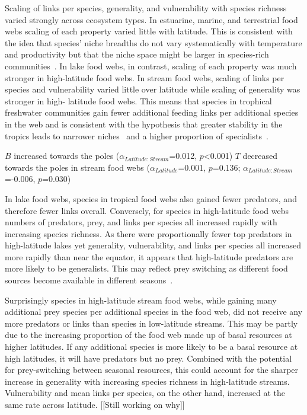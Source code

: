 \documentclass[12pt]{article}
\begin{document}
Scaling of links per species, generality, and vulnerability with species
richness varied strongly across ecosystem types. In estuarine, marine, and
terrestrial food webs scaling of each property varied little with latitude.
This is consistent with the idea that species' niche breadths do not vary
systematically with temperature and productivity but that the niche space
might be larger in species-rich communities~\citep{Davies2007}. In lake food
webs, in contrast, scaling of each property was much stronger in high-latitude
food webs. In stream food webs, scaling of links per species and vulnerability
varied little over latitude while scaling of generality was stronger in high-
latitude food webs. This means that species in trophical freshwater
communities gain fewer additional feeding links per additional species in the
web and is consistent with the hypothesis that greater stability in the
tropics leads to narrower niches~\citep{Brown2004} and a higher proportion of
specialists~\citep{}.



   $B$ increased towards the poles ($\alpha_{Latitude:Stream}$=0.012, $p$\textless0.001)
   $T$ decreased towards the poles in stream food webs ($\alpha_{Latitude}$=0.001, $p$=0.136;
  $\alpha_{Latitude:Stream}$=-0.006, $p$=0.030) 


In lake food webs, species in tropical food webs also gained fewer predators,
and therefore fewer links overall. Conversely, for species in high-latitude
food webs numbers of predators, prey, and links per species all increased
rapidly with increasing species richness.
As there were proportionally fewer top predators in high-latitude lakes yet
generality, vulnerability, and links per species all increased more rapidly than
near the equator, it appears that high-latitude predators are more likely to be 
generalists. This may reflect prey switching as
different food sources become available in different seasons~\citep{}.


Surprisingly species in high-latitude stream food webs, while gaining many
additional prey species per additional species in the food web, did not
receive any more predators or links than species in low-latitude streams. 
This may be partly due to the increasing proportion of the food web made up of
basal resources at higher latitudes. If any additional species is more likely to
be a basal resource at high latitudes, it will have predators but no prey.
Combined with the potential for prey-switching between seasonal resources, this 
could account for the sharper increase in generality with increasing species richness
in high-latitude streams. Vulnerability and mean links per species, on the other hand,
increased at the same rate across latitude. [[Still working on why]]
\end{document}
